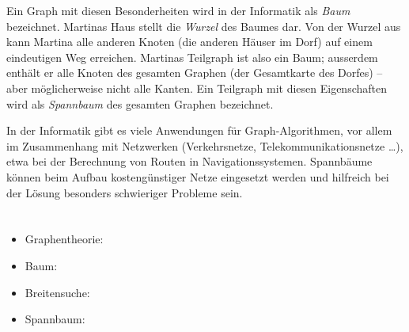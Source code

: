 {{Ein Graph mit diesen Besonderheiten wird in der Informatik als \emph{Baum} bezeichnet. Martinas Haus stellt die \emph{Wurzel} des Baumes dar. Von der Wurzel aus kann Martina alle anderen Knoten (die anderen Häuser im Dorf) auf einem eindeutigen Weg erreichen.  Martinas Teilgraph ist also ein Baum; ausserdem enthält er alle Knoten des gesamten Graphen (der Gesamtkarte des Dorfes) – aber möglicherweise nicht alle Kanten. Ein Teilgraph mit diesen Eigenschaften wird als \emph{Spannbaum} des gesamten Graphen bezeichnet.

In der Informatik gibt es viele Anwendungen für Graph-Algorithmen, vor allem im Zusammenhang mit Netzwerken (Verkehrsnetze, Telekommunikationsnetze …), etwa bei der Berechnung von Routen in Navigationssystemen.  Spannbäume können beim Aufbau kostengünstiger Netze eingesetzt werden und hilfreich bei der Lösung besonders schwieriger Probleme sein.



\section*{\BrochureWebsitesAndKeywords}
{\raggedright
\begin{itemize}
  \item Graphentheorie: \href{https://de.wikipedia.org/wiki/Graph_(Graphentheorie)}{}
  \item Baum: \href{https://de.wikipedia.org/wiki/Baum_(Graphentheorie)}{}
  \item Breitensuche: \href{https://de.wikipedia.org/wiki/Breitensuche}{}
  \item Spannbaum: \href{https://de.wikipedia.org/wiki/Spannbaum}{}
\end{itemize}


}

}{}

\def\AuthorGutierrezJ{} %
\def\AuthorLunaC{} %
\def\AuthorSchluterK{} %
\def\AuthorSerafiniG{} %
\def\AuthorIkramovA{} %
\def\AuthorDatzkoThutS{} %

\newpage}{}
